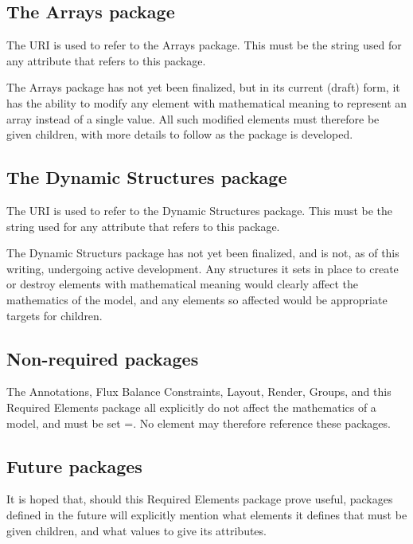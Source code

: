 \subsection{The Arrays package}

The URI  is used to refer to the Arrays package.  This must be the string used for any  attribute that refers to this package.

The Arrays package has not yet been finalized, but in its current (draft) form, it has the ability to modify any element with mathematical meaning to represent an array instead of a single value.  All such modified elements must therefore be given \ChangedMath children, with more details to follow as the package is developed.


\subsection{The Dynamic Structures package}

The URI  is used to refer to the Dynamic Structures package.  This must be the string used for any  attribute that refers to this package.

The Dynamic Structurs package has not yet been finalized, and is not, as of this writing, undergoing active development.  Any structures it sets in place to create or destroy elements with mathematical meaning would clearly affect the mathematics of the model, and any elements so affected would be appropriate targets for \ChangedMath children.


\subsection{Non-required packages}

The Annotations,  Flux Balance Constraints, Layout, Render, Groups, and this Required Elements package all explicitly do not affect the mathematics of a model, and must be set =.  No \ChangedMath element may therefore reference these packages.


\subsection{Future packages}

It is hoped that, should this Required Elements package prove useful, packages defined in the future will explicitly mention what elements it defines that must be given \ChangedMath children, and what values to give its attributes.  
